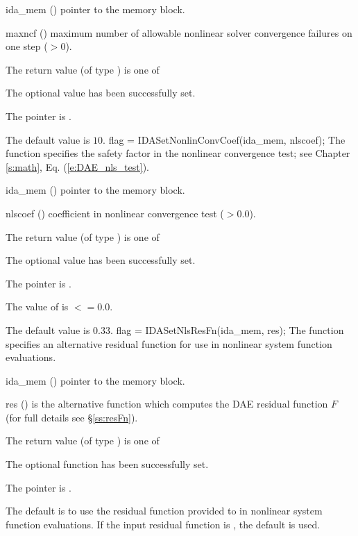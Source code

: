 {{\begin{args}
  \item[ida\_mem] ()
    pointer to the {\ida} memory block.
  \item[maxncf] ()
    maximum number of allowable nonlinear solver convergence failures
    on one step ($>0$).
  \end{args}
}
{
  The return value  (of type ) is one of
  \begin{args}
  \item[\Id{IDA\_SUCCESS}]
    The optional value has been successfully set.
  \item[\Id{IDA\_MEM\_NULL}]
    The  pointer is .
  \end{args}
}
{
  The default value is $10$.
}
{
flag = IDASetNonlinConvCoef(ida\_mem, nlscoef);
}
{
  The function  specifies the safety factor
  in the nonlinear convergence test;
  see Chapter \ref{s:math}, Eq. (\ref{e:DAE_nls_test}).
}
{
  \begin{args}
  \item[ida\_mem] ()
    pointer to the {\ida} memory block.
  \item[nlscoef] ()
    coefficient in nonlinear convergence test ($>0.0$).
  \end{args}
}
{
  The return value  (of type ) is one of
  \begin{args}
  \item[\Id{IDA\_SUCCESS}]
    The optional value has been successfully set.
  \item[\Id{IDA\_MEM\_NULL}]
    The  pointer is .
  \item[\Id{IDA\_ILL\_INPUT}]
    The value of  is $<= 0.0$.
  \end{args}
}
{
  The default value is $0.33$.
}
{
  flag = IDASetNlsResFn(ida\_mem, res);
}
{
  The function  specifies an alternative residual function
  for use in nonlinear system function evaluations.
}
{
  \begin{args}
  \item[ida\_mem] ()
    pointer to the {\ida} memory block.
  \item[res] ()
    is the alternative {\CC} function which computes the DAE residual function
    $F$ (for full details see \S\ref{ss:resFn}).
  \end{args}
}
{
  The return value  (of type ) is one of
  \begin{args}
  \item[\Id{IDA\_SUCCESS}]
    The optional function has been successfully set.
  \item[\Id{IDA\_MEM\_NULL}]
    The  pointer is .
  \end{args}
}
{
  The default is to use the residual function provided to  in
  nonlinear system function evaluations. If the input residual function is
  , the default is used.

}}

